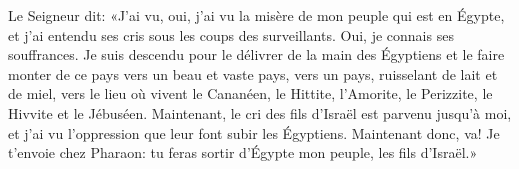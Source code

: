 Le Seigneur dit:
	«J’ai vu, oui, j’ai vu la misère de mon peuple qui est en Égypte,
	et j’ai entendu ses cris sous les coups des surveillants.
	Oui, je connais ses souffrances.
Je suis descendu pour le délivrer de la main des Égyptiens
	et le faire monter de ce pays vers un beau et vaste pays,
	vers un pays, ruisselant de lait et de miel,
	vers le lieu où vivent le Cananéen, le Hittite,
	l’Amorite, le Perizzite, le Hivvite et le Jébuséen.
Maintenant, le cri des fils d’Israël est parvenu jusqu’à moi,
	et j’ai vu l’oppression que leur font subir les Égyptiens.
Maintenant donc, va! Je t’envoie chez Pharaon:
	tu feras sortir d’Égypte mon peuple, les fils d’Israël.»

